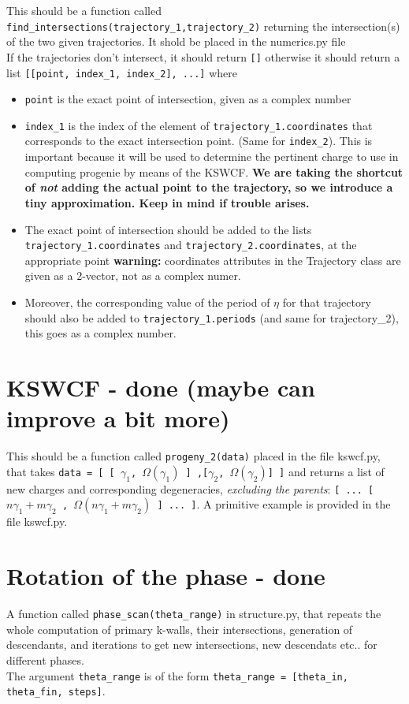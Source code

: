 \documentclass[11pt]{report}
\begin{document}
This should be a function called \texttt{find\_intersections(trajectory\_1,trajectory\_2)} returning the intersection(s) of the two given trajectories. It shold be placed in the numerics.py file\\
If the trajectories don't intersect, it should return {\tt []} otherwise it should return a list {\tt [[point, index\_1, index\_2], ...]} where
\begin{itemize}
\item {\tt point} is the exact point of intersection, given as a complex number 
\item {\tt index\_1} is the index of the element of {\tt trajectory\_1.coordinates} that corresponds to the exact intersection point. (Same for {\tt index\_2}). This is important because it will be used to determine the pertinent charge to use in computing progenie by means of the KSWCF. {\bf We are taking the shortcut of \emph{not} adding the actual point to the trajectory, so we introduce a tiny approximation. Keep in mind if trouble arises.}
\item The exact point of intersection should be added to the lists {\tt trajectory\_1.coordinates} and {\tt trajectory\_2.coordinates}, at the appropriate point {\bf warning:} coordinates attributes in the Trajectory class are given as a 2-vector, not as a complex numer. 
\item Moreover, the corresponding value of the period of $\eta$ for that trajectory should also be added to {\tt trajectory\_1.periods} (and same for trajectory\_2), this goes as a complex number.
\end{itemize}

\section{KSWCF  - {\color{red} \bf done} {\tiny \bf (maybe can improve a bit more)}}
This should be a function called {\tt progeny\_2(data)} placed in the file kswcf.py, that takes {\tt data = [ [ $\gamma_{1}$, $\Omega(\gamma_{1})$  ] ,[$\gamma_{2}$, $\Omega(\gamma_{2})$] ]} and returns a list of new charges and corresponding degeneracies, \emph{excluding the parents}:
{\tt [ ...  [ $n \gamma_{1}+ m \gamma_{2}$ , $\Omega(n \gamma_{1}+ m \gamma_{2})$  ]  ... ]}.
A primitive example is provided in the file kswcf.py.



\section{Rotation of the phase - {\color{red} \bf done}}
A function called {\tt phase\_scan(theta\_range)} in structure.py, that repeats the whole computation of primary k-walls, their intersections, generation of descendants, and iterations to get new intersections, new descendats etc.. for different phases.\\
The argument {\tt theta\_range} is of the form {\tt theta\_range = [theta\_in, theta\_fin, steps]}.
\end{document}
